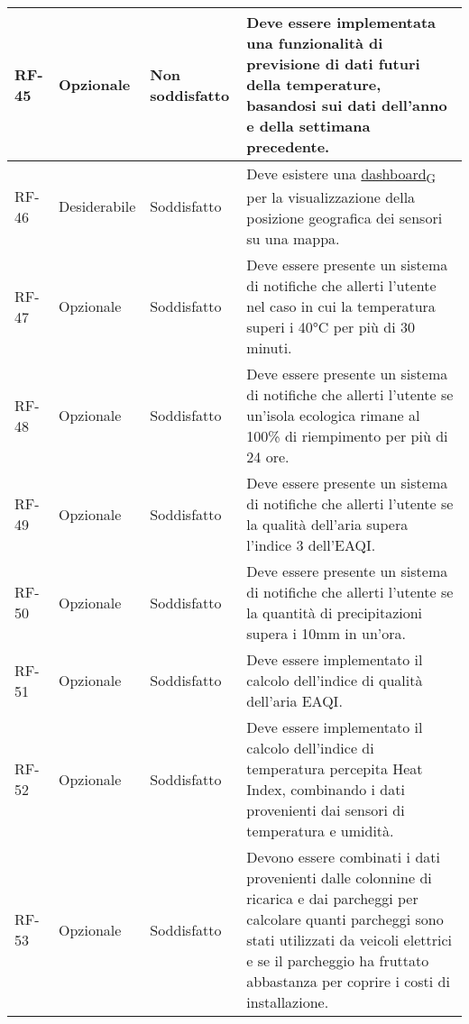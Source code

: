\begin{longtable}{|>{\centering\arraybackslash}m{}|>{\centering\arraybackslash}m{}|>{\centering\arraybackslash}m{}|>{\centering\arraybackslash}m{}|}
	\\\hline
	RF-45           & Opzionale           & Non soddisfatto & Deve essere implementata una funzionalità di previsione di dati futuri della temperature, basandosi sui dati dell'anno e della settimana precedente.
	\\\hline
	RF-46           & Desiderabile        & Soddisfatto & Deve esistere una \href{https://7last.github.io/docs/pb/documentazione-interna/glossario\#dashboard}{dashboard\textsubscript{G}} per la visualizzazione della posizione geografica dei sensori su una mappa.
	\\\hline
	RF-47           & Opzionale           & Soddisfatto & Deve essere presente un sistema di notifiche che allerti l'utente nel caso in cui la temperatura superi i 40°C per più di 30 minuti.
	\\\hline
	RF-48           & Opzionale           & Soddisfatto                                                                                                           & Deve essere presente un sistema di notifiche che allerti l'utente se un'isola ecologica rimane al 100\% di riempimento per più di 24 ore.
	\\\hline
	RF-49           & Opzionale           & Soddisfatto                                                                                                           & Deve essere presente un sistema di notifiche che allerti l'utente se la qualità dell'aria supera l'indice 3 dell'EAQI.
	\\\hline
	RF-50           & Opzionale           & Soddisfatto                                                                                                           & Deve essere presente un sistema di notifiche che allerti l'utente se la quantità di precipitazioni supera i 10mm in un'ora.
	\\\hline
	RF-51           & Opzionale           & Soddisfatto                                                                                                           & Deve essere implementato il calcolo dell'indice di qualità dell'aria EAQI.
	\\\hline
	RF-52           & Opzionale           & Soddisfatto                                                                                                           & Deve essere implementato il calcolo dell'indice di temperatura percepita Heat Index, combinando i dati provenienti dai sensori di temperatura e umidità.
	\\\hline
	RF-53           & Opzionale           & Soddisfatto                                                                                                           & Devono essere combinati i dati provenienti dalle colonnine di ricarica e dai parcheggi per calcolare quanti parcheggi sono stati utilizzati da veicoli elettrici e se il parcheggio ha fruttato abbastanza per coprire i costi di installazione.

\end{longtable}
